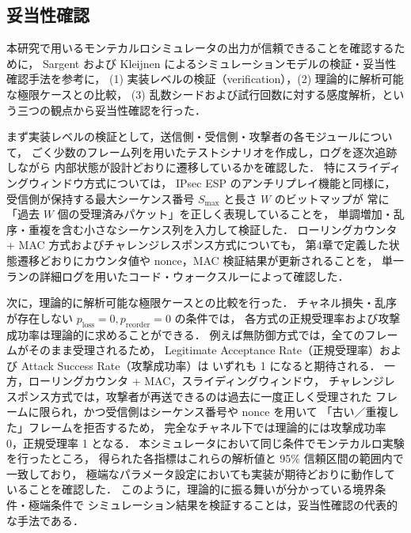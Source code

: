 \documentclass[twocolumn,10pt,a4paper]{jsarticle}
\begin{document}
\subsection{妥当性確認}
\label{subsec:sim-validation}

本研究で用いるモンテカルロシミュレータの出力が信頼できることを確認するために，
Sargent および Kleijnen によるシミュレーションモデルの検証・妥当性確認手法\cite{Sargent2013VVA,Kleijnen1995VV}を参考に，
(1) 実装レベルの検証（verification），(2) 理論的に解析可能な極限ケースとの比較，
(3) 乱数シードおよび試行回数に対する感度解析，という三つの観点から妥当性確認を行った．

まず実装レベルの検証として，送信側・受信側・攻撃者の各モジュールについて，
ごく少数のフレーム列を用いたテストシナリオを作成し，ログを逐次追跡しながら
内部状態が設計どおりに遷移しているかを確認した．
特にスライディングウィンドウ方式については，
IPsec ESP のアンチリプレイ機能\cite{rfc4303}と同様に，
受信側が保持する最大シーケンス番号 $S_{\max}$ と長さ $W$ のビットマップが
常に「過去 $W$ 個の受理済みパケット」を正しく表現していることを，
単調増加・乱序・重複を含む小さなシーケンス列を入力して検証した．
ローリングカウンタ + MAC 方式およびチャレンジレスポンス方式についても，
第4章で定義した状態遷移どおりにカウンタ値や nonce，MAC 検証結果が更新されることを，
単一ランの詳細ログを用いたコード・ウォークスルーによって確認した\cite{Kleijnen1995VV}．

次に，理論的に解析可能な極限ケースとの比較を行った．
チャネル損失・乱序が存在しない $p_{\mathrm{loss}} = 0, p_{\mathrm{reorder}} = 0$ の条件では，
各方式の正規受理率および攻撃成功率は理論的に求めることができる．
例えば無防御方式では，全てのフレームがそのまま受理されるため，
Legitimate Acceptance Rate（正規受理率）および Attack Success Rate（攻撃成功率）は
いずれも 1 になると期待される．
一方，ローリングカウンタ + MAC，スライディングウィンドウ，
チャレンジレスポンス方式では，攻撃者が再送できるのは過去に一度正しく受理された
フレームに限られ，かつ受信側はシーケンス番号や nonce を用いて
「古い／重複した」フレームを拒否するため，
完全なチャネル下では理論的には攻撃成功率 0，正規受理率 1 となる．
本シミュレータにおいて同じ条件でモンテカルロ実験を行ったところ，
得られた各指標はこれらの解析値と 95\% 信頼区間の範囲内で一致しており，
極端なパラメータ設定においても実装が期待どおりに動作していることを確認した．
このように，理論的に振る舞いが分かっている境界条件・極端条件で
シミュレーション結果を検証することは，妥当性確認の代表的な手法である\cite{Sargent2013VVA,Kleijnen1995VV}．
\end{document}
